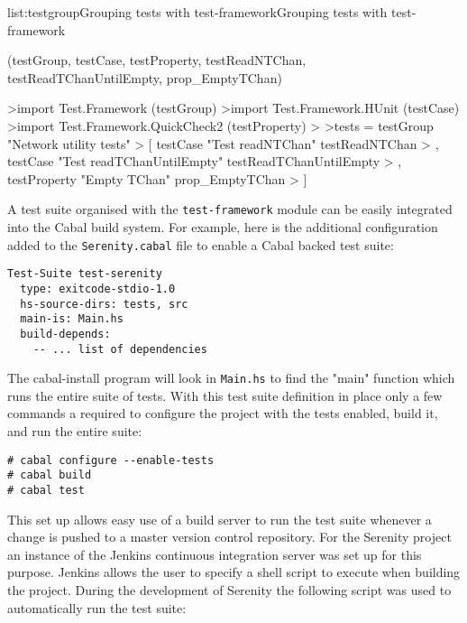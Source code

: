 \vspace{-0.5em}
\begin{listing}{list:testgroup}{Grouping tests with test-framework}{Grouping tests with test-framework}{}
\end{listing}\vspace{-1.5em}

\functions(testGroup, testCase, testProperty, testReadNTChan, testReadTChanUntilEmpty, prop_EmptyTChan)
\begin{haskell}
>import Test.Framework (testGroup)
>import Test.Framework.HUnit (testCase)
>import Test.Framework.QuickCheck2 (testProperty)
>
>tests = testGroup "Network utility tests"
> [ testCase "Test readNTChan" testReadNTChan
> , testCase "Test readTChanUntilEmpty" testReadTChanUntilEmpty
> , testProperty "Empty TChan" prop_EmptyTChan
> ]

\end{haskell}
\noindent
A test suite organised with the \texttt{test-framework} module can be easily integrated into the
Cabal build system.
For example, here is the additional configuration added to the \texttt{Serenity.cabal}
file to enable a Cabal backed test suite:

\begin{verbatim}
Test-Suite test-serenity
  type: exitcode-stdio-1.0
  hs-source-dirs: tests, src
  main-is: Main.hs
  build-depends:
    -- ... list of dependencies
\end{verbatim}

\noindent
The cabal-install program will look in \texttt{Main.hs} to find the "main" function
which runs the entire suite of tests.
With this test suite definition in place only a few commands a required to
configure the project with the tests enabled, build it, and run the entire suite:

\begin{verbatim}
# cabal configure --enable-tests
# cabal build
# cabal test
\end{verbatim}

This set up allows easy use of a build server to run the test suite whenever a change
is pushed to a master version control repository. For the Serenity project an instance
of the Jenkins continuous integration server was set up for this purpose.
Jenkins allows the user to specify a shell script to execute when building the project.
During the development of Serenity the following script was used to automatically run
the test suite:

